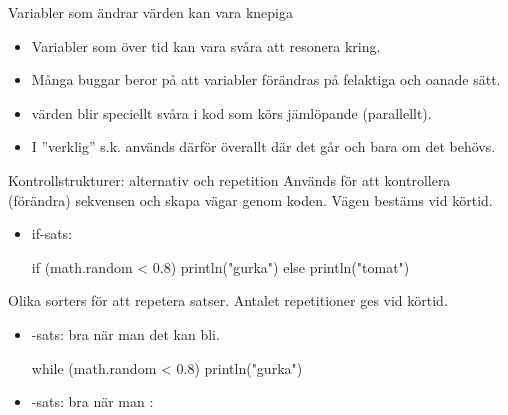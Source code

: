\begin{Slide}{Variabler som ändrar värden kan vara knepiga}
\begin{itemize}
\item Variabler som  över tid kan vara svåra att resonera kring.

\item Många buggar beror på att variabler förändras på felaktiga och oanade sätt.

\item {} värden blir speciellt svåra i kod som körs jämlöpande (parallellt).

\item I ''verklig'' s.k.  används därför  överallt där det går och  bara om det  behövs.
\end{itemize}
\end{Slide}



\begin{Slide}{Kontrollstrukturer: alternativ och repetition}\SlideFontSmall
Används för att kontrollera (förändra) sekvensen och skapa  vägar genom koden. Vägen  bestäms vid körtid.
\begin{itemize}
\item if-sats:
\begin{Code}
if (math.random < 0.8) println("gurka") else println("tomat")
\end{Code}
\end{itemize}

Olika sorters  för att repetera satser. Antalet repetitioner ges vid körtid.
\begin{itemize}
\item {}-sats: bra när man  det kan bli.
\begin{Code}
while (math.random < 0.8) println("gurka")
\end{Code}

\item {}-sats: bra när man :

\end{itemize}
\end{Slide}

